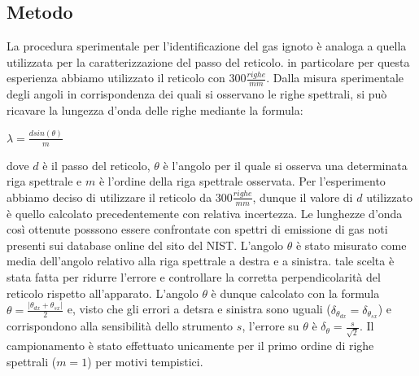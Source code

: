 \documentclass[a4paper]{article}
\begin{document}
\subsection{Metodo}
La procedura sperimentale per l'identificazione del gas ignoto è analoga a quella utilizzata per la caratterizzazione del passo del reticolo. in particolare per questa esperienza abbiamo utilizzato il reticolo con $300 \frac{righe}{mm}$. Dalla misura sperimentale degli angoli in corrispondenza dei quali si osservano le righe spettrali, si può ricavare la lungezza d'onda delle righe mediante la formula:
\begin{center}
    $\lambda=\frac{dsin(\theta)}{m}$
    \label{eq: lambda_gas_ignoto_reticolo}
\end{center}
dove $d$ è il passo del reticolo, $\theta$ è l'angolo per il quale si osserva una determinata riga spettrale e $m$ è l'ordine della riga spettrale osservata. Per l'esperimento abbiamo deciso di utilizzare il reticolo da $300\frac{righe}{mm}$, dunque il valore di $d$ utilizzato è quello calcolato precedentemente con relativa incertezza.
Le lunghezze d'onda così ottenute posssono essere confrontate con spettri di emissione di gas noti presenti sui database online del sito del NIST.
L'angolo $\theta$ è stato misurato come media dell'angolo relativo alla riga spettrale a destra e a sinistra. tale scelta è stata fatta per ridurre l'errore e controllare la corretta perpendicolarità del reticolo rispetto all'apparato. L'angolo $\theta$ è dunque calcolato con la formula $\theta=\frac{|\theta_{dx}+\theta_{sx}|}{2}$ e, visto che gli errori a detsra e sinistra sono uguali ($\delta_{\theta_{dx}}=\delta_{\theta_{sx}}$) e corrispondono alla sensibilità dello strumento $s$, l'errore su $\theta$ è $\delta_\theta=\frac{s}{\sqrt{2}}$. Il campionamento è stato effettuato unicamente per il primo ordine di righe spettrali ($m=1$) per motivi tempistici.
\end{document}
